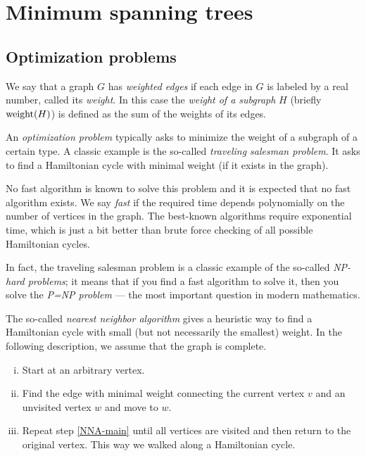 \chapter{Minimum spanning trees}


\section{Optimization problems}

We say that a graph $G$ has \emph{weighted edges} if each edge in $G$ is labeled by a real number, called its {}\emph{weight}.
In this case the {}\emph{weight of a subgraph} $H$ (briefly $\mathop{\rm weight}\nolimits(H)$) is defined as the sum of the weights of its edges.

An {}\emph{optimization problem} typically asks to minimize the weight of a subgraph of a certain type.
A classic example is the so-called \emph{traveling salesman problem}.
It asks to find a Hamiltonian cycle with minimal weight (if it exists in the graph).

No fast algorithm is known to solve this problem and it is expected that no fast algorithm exists.
We say \textit{fast} if the required time depends polynomially on the number of vertices in the graph.
The best-known algorithms require exponential time, which is just a bit better than brute force checking of all possible Hamiltonian cycles.

In fact, the traveling salesman problem is a classic example of the so-called \textit{NP-hard problems}; it means that if you find a fast algorithm to solve it, then you solve the \emph{P=NP problem} --- the most important question in modern mathematics.

The so-called \emph{nearest neighbor algorithm} gives a heuristic way to find a Hamiltonian cycle with small (but not necessarily the smallest) weight.
In the following description, we assume that the graph is complete.
\begin{enumerate}[(i)]
\item Start at an arbitrary vertex.
\item\label{NNA-main} Find the edge with minimal weight connecting the current vertex $v$ and an unvisited vertex $w$ and move to $w$.
\item Repeat step \ref{NNA-main} until all vertices are visited and then return to the original vertex.
This way we walked along a Hamiltonian cycle.
\end{enumerate}

